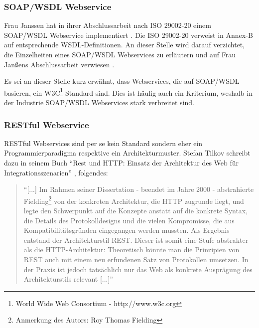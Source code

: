 \subsubsection{SOAP/WSDL Webservice}
Frau Janssen hat in ihrer Abschlussarbeit nach ISO 29002-20 einem \gls{SOAP}/\gls{WSDL} \gls{Webservice} implementiert \citep[vgl.][]{janssen}. Die ISO 29002-20 verweist in Annex-B auf entsprechende \gls{WSDL}-Definitionen. 
An dieser Stelle wird darauf verzichtet, die Einzelheiten eines \gls{SOAP}/\gls{WSDL} \glspl{Webservice} zu erläutern und auf Frau Janßens Abschlussarbeit verwiesen \citep[vgl.][Kap. 3]{janssen}. 

Es sei an dieser Stelle kurz erwähnt, dass \glspl{Webservice}, die auf \gls{SOAP}/\gls{WSDL} basieren, ein W3C\footnote{World Wide Web Consortium - http://www.w3c.org} Standard sind. Dies ist häufig auch ein Kriterium, weshalb in der Industrie \gls{SOAP}/\gls{WSDL} \glspl{Webservice} stark verbreitet sind. 

\subsubsection{RESTful Webservice}  
\gls{REST}ful Webservices sind per se kein Standard sondern eher ein Programmierparadigma respektive ein Architekturmuster. 
Stefan Tilkov schreibt dazu in seinem Buch \enquote{Rest und HTTP: Einsatz der Architektur des Web für Integrationsszenarien} \citep[S.10][]{tilkovrest}, folgendes:

\begin{quotation}
\enquote{[...] Im Rahmen seiner Dissertation - beendet im Jahre 2000 - abstrahierte Fielding\footnote{Anmerkung des Autors: Roy Thomas Fielding} von der konkreten Architektur, die \gls{HTTP} zugrunde liegt, und legte den Schwerpunkt auf die Konzepte anstatt auf die konkrete Syntax, die Details des Protokolldesigns und die vielen Kompromisse, die aus Kompatibilitätsgründen eingegangen werden mussten. Als Ergebnis entstand der Architekturstil \gls{REST}. Dieser ist somit eine Stufe abstrakter als die \gls{HTTP}-Architektur: Theoretisch könnte man die Prinzipien von \gls{REST} auch mit einem neu erfundenen Satz von Protokollen umsetzen. In der Praxis ist jedoch tatsächlich nur das Web als konkrete Ausprägung des Architekturstils relevant [...]}
\end{quotation}
\citep[Vgl. auch][]{fieldingrest}

